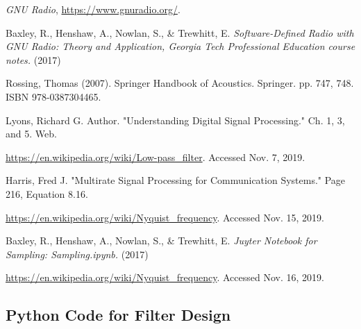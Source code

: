 \begin{thebibliography}{1}

\emph{GNU Radio}, \url{https://www.gnuradio.org/}.

Baxley, R., Henshaw, A., Nowlan, S., \& Trewhitt, E. \emph{Software-Defined Radio with GNU Radio: Theory and Application, Georgia Tech Professional Education course notes.} (2017)

Rossing, Thomas (2007). Springer Handbook of Acoustics. Springer. pp. 747, 748. ISBN 978-0387304465.

Lyons, Richard G. Author. "Understanding Digital Signal Processing."  Ch. 1, 3, and 5. Web.

\url{https://en.wikipedia.org/wiki/Low-pass_filter}.  Accessed Nov. 7, 2019.

Harris, Fred J. "Multirate Signal Processing for Communication Systems." Page 216, Equation 8.16.

\url{https://en.wikipedia.org/wiki/Nyquist_frequency}.  Accessed Nov. 15, 2019.

Baxley, R., Henshaw, A., Nowlan, S., \& Trewhitt, E. \emph{Juyter Notebook for Sampling: Sampling.ipynb.} (2017)

\url{https://en.wikipedia.org/wiki/Nyquist_frequency}.  Accessed Nov. 16, 2019.

\end{thebibliography}


\newpage


\onecolumn
\appendix 

\subsection{Python Code for Filter Design\cite{notes:class}}






